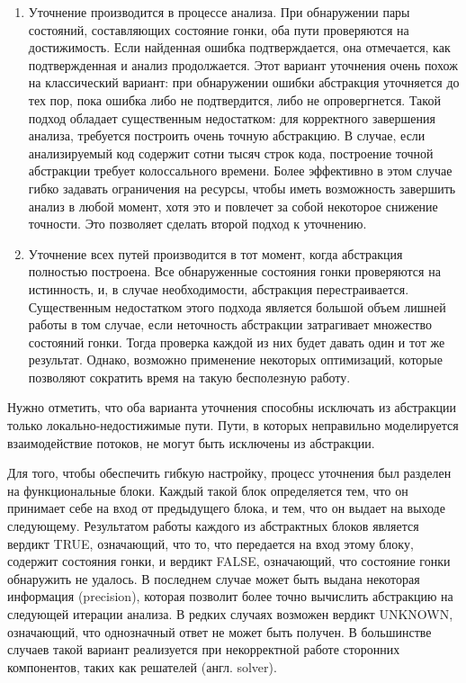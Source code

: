 \begin{enumerate}
\item Уточнение производится в процессе анализа. При обнаружении пары состояний, составляющих состояние гонки, оба пути проверяются на достижимость. Если найденная ошибка подтверждается, она отмечается, как подтвержденная и анализ продолжается.
Этот вариант уточнения очень похож на классический вариант: при обнаружении ошибки абстракция уточняется до тех пор, пока ошибка либо не подтвердится, либо не опровергнется.
Такой подход обладает существенным недостатком: для корректного завершения анализа, требуется построить очень точную абстракцию. 
В случае, если анализируемый код содержит сотни тысяч строк кода, построение точной абстракции требует колоссального времени. 
Более эффективно в этом случае гибко задавать ограничения на ресурсы, чтобы иметь возможность завершить анализ в любой момент, хотя это и повлечет за собой некоторое снижение точности. 
Это позволяет сделать второй подход к уточнению.

\item Уточнение всех путей производится в тот момент, когда абстракция полностью построена. Все обнаруженные состояния гонки проверяются на истинность, и, в случае необходимости, абстракция перестраивается. 
Существенным недостатком этого подхода является большой объем лишней работы в том случае, если неточность абстракции затрагивает множество состояний гонки.
Тогда проверка каждой из них будет давать один и тот же результат.
Однако, возможно применение некоторых оптимизаций, которые позволяют сократить время на такую бесполезную работу. 
\end{enumerate}

Нужно отметить, что оба варианта уточнения способны исключать из абстракции только локально-недостижимые пути.
Пути, в которых неправильно моделируется взаимодействие потоков, не могут быть исключены из абстракции.

Для того, чтобы обеспечить гибкую настройку, процесс уточнения был разделен на функциональные блоки.
Каждый такой блок определяется тем, что он принимает себе на вход от предыдущего блока, и тем, что он выдает на выходе следующему.
Результатом работы каждого из абстрактных блоков является вердикт TRUE, означающий, что то, что передается на вход этому блоку, содержит состояния гонки, и вердикт FALSE, означающий, что состояние гонки обнаружить не удалось.
В последнем случае может быть выдана некоторая информация (precision), которая позволит более точно вычислить абстракцию на следующей итерации анализа.
В редких случаях возможен вердикт UNKNOWN, означающий, что однозначный ответ не может быть получен. 
В большинстве случаев такой вариант реализуется при некорректной работе сторонних компонентов, таких как решателей (англ. solver).

